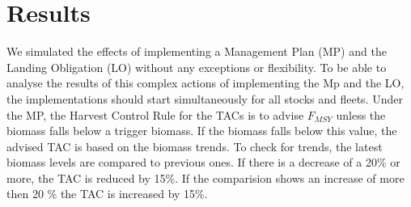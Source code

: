 \documentclass[12pt,oneline,a4paper,numbib]{ouparticle}
\numberwithin{equation}{subsection} %
\begin{document}



\section{Results}
\label{sec3}

We simulated the effects of implementing a Management Plan (MP) and the Landing Obligation (LO) without any exceptions or flexibility. To be able to analyse the results of this complex actions of implementing the Mp and the LO, the implementations should start simultaneously for all stocks and fleets. Under the MP, the Harvest Control Rule for the TACs is to advise $F_{MSY}$ unless the biomass falls below a trigger biomass. If the biomass falls below this value, the advised TAC is based on the biomass trends. To check for trends, the latest biomass levels are compared to previous ones. If there is a decrease of a 20\% or more, the TAC is reduced by 15\%. If the comparision shows an increase of more then 20 \% the TAC is increased by 15\%.
\end{document}
